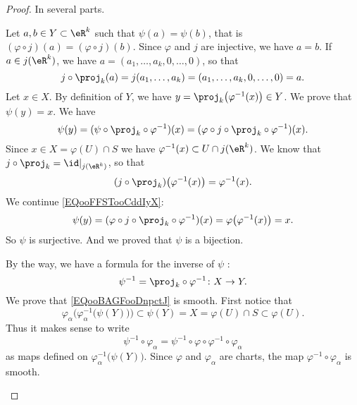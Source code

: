 \begin{proof}
	In several parts.
	\begin{subproof}
		Let \( a,b\in Y\subset \eR^k\) such that \( \psi(a)=\psi(b)\), that is \( (\varphi\circ j)(a)=(\varphi\circ j)(b)\). Since \( \varphi\) and \( j\) are injective, we have \( a=b\).
		\spitem[\( j\circ\proj_k=\id|_{j(\eR^k)}\)]
		If \( a\in j(\eR^k)\), we have \( a=(a_1,\ldots, a_k,0,\ldots, 0)\), so that
		\begin{equation}
			j\circ\proj_k(a)=j(a_1,\ldots, a_k)=(a_1,\ldots, a_k,0,\ldots, 0)=a.
		\end{equation}
		Let \( x\in X\). By definition of \( Y\), we have \( y=\proj_k\big( \varphi^{-1}(x) \big)\in Y\). We prove that \( \psi(y)=x\). We have
		\begin{equation}        \label{EQooFFSTooCddIyX}
			\psi(y)=(\psi\circ\proj_k\circ\varphi^{-1})(x)=(\varphi\circ j\circ\proj_k\circ\varphi^{-1})(x).
		\end{equation}
		Since \( x\in X=\varphi(U)\cap S\) we have \( \varphi^{-1}(x)\subset U\cap j(\eR^k)\). We know that \( j\circ\proj_k=\id|_{j(\eR^k)}\), so that
		\begin{equation}
			(j\circ\proj_k)\big( \varphi^{-1}(x) \big)=\varphi^{-1}(x).
		\end{equation}
		We continue \eqref{EQooFFSTooCddIyX}:
		\begin{equation}
			\psi(y)=(\varphi\circ j\circ\proj_k\circ\varphi^{-1})(x)=\varphi\big( \varphi^{-1}(x) \big)=x.
		\end{equation}
		So \( \psi\) is surjective. And we proved that \( \psi\) is a bijection.

		By the way, we have a formula for the inverse of \( \psi\) :
		\begin{equation}        \label{EQooQSZUooWsAqCz}
			\psi^{-1}=\proj_k\circ\varphi^{-1}\colon X\to Y.
		\end{equation}
		We prove that \eqref{EQooBAGFooDnpctJ} is smooth. First notice that
		\begin{equation}
			\varphi_{\alpha}\Big( \varphi_{\alpha}^{-1}\big( \psi(Y) \big) \Big)\subset\psi(Y)=X=\varphi(U)\cap S\subset \varphi(U).
		\end{equation}
		Thus it makes sense to write
		\begin{equation}        \label{EQooOTSUooXHGAZz}
			\psi^{-1}\circ\varphi_{\alpha}=\psi^{-1}\circ\varphi\circ\varphi^{-1}\circ\varphi_{\alpha}
		\end{equation}
		as maps defined on \( \varphi_{\alpha}^{-1}\big( \psi(Y) \big)\). Since \( \varphi\) and \( \varphi_{\alpha}\) are charts, the map \( \varphi^{-1}\circ\varphi_{\alpha}\) is smooth.


\end{subproof}
\end{proof}
